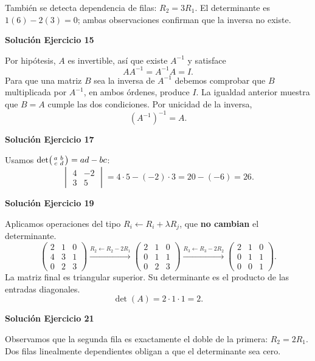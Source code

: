 \documentclass[12pt]{article}
\begin{document}
También se detecta dependencia de filas: $R_2=3R_1$. El determinante es $1(6)-2(3)=0$; ambas observaciones confirman que la inversa no existe.


\par\bigskip\noindent\textbf{Solución Ejercicio 15}\par\nobreak
Por hipótesis, $A$ es invertible, así que existe $A^{-1}$ y satisface
\[
AA^{-1}=A^{-1}A=I.
\]
Para que una matriz $B$ sea la inversa de $A^{-1}$ debemos comprobar que $B$ multiplicada por $A^{-1}$, en ambos órdenes, produce $I$. La igualdad anterior muestra que $B=A$ cumple las dos condiciones. Por unicidad de la inversa,
\[
\boxed{(A^{-1})^{-1}=A}.
\]

\par\bigskip\noindent\textbf{Solución Ejercicio 17}\par\nobreak
Usamos $\det\begin{psmallmatrix}a&b\\c&d\end{psmallmatrix}=ad-bc$:
\[
\begin{vmatrix}4&-2\\3&5\end{vmatrix}=4\cdot 5-(-2)\cdot 3=20-(-6)=26.
\]

\par\bigskip\noindent\textbf{Solución Ejercicio 19}\par\nobreak
Aplicamos operaciones del tipo $R_i\leftarrow R_i+\lambda R_j$, que \textbf{no cambian} el determinante.
\[
\begin{pmatrix}2&1&0\\4&3&1\\0&2&3\end{pmatrix}\xrightarrow{R_2\leftarrow R_2-2R_1}\begin{pmatrix}2&1&0\\0&1&1\\0&2&3\end{pmatrix}\xrightarrow{R_3\leftarrow R_3-2R_2}\begin{pmatrix}2&1&0\\0&1&1\\0&0&1\end{pmatrix}.
\]
La matriz final es triangular superior. Su determinante es el producto de las entradas diagonales. \[
\boxed{\det(A)=2\cdot1\cdot1=2}.
\]

\par\bigskip\noindent\textbf{Solución Ejercicio 21}\par\nobreak
Observamos que la segunda fila es exactamente el doble de la primera: $R_2=2R_1$. Dos filas linealmente dependientes obligan a que el determinante sea cero.
\end{document}
